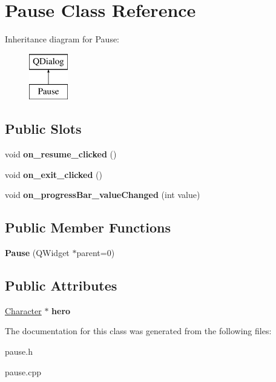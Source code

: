 \hypertarget{class_pause}{\section{Pause Class Reference}
\label{class_pause}
}
Inheritance diagram for Pause\-:\begin{figure}[H]
\begin{center}
\leavevmode
\includegraphics[height=2.000000cm]{class_pause}
\end{center}
\end{figure}
\subsection*{Public Slots}
\begin{DoxyCompactItemize}
\item 
\hypertarget{class_pause_ad632066c1f745b88f328f609de26419f}{void {\bfseries on\-\_\-resume\-\_\-clicked} ()}\label{class_pause_ad632066c1f745b88f328f609de26419f}

\item 
\hypertarget{class_pause_aed0cb80fa11b7556ffe285bb83696e55}{void {\bfseries on\-\_\-exit\-\_\-clicked} ()}\label{class_pause_aed0cb80fa11b7556ffe285bb83696e55}

\item 
\hypertarget{class_pause_a2b4c1e4ee50785bcca1dc1c422f527b3}{void {\bfseries on\-\_\-progress\-Bar\-\_\-value\-Changed} (int value)}\label{class_pause_a2b4c1e4ee50785bcca1dc1c422f527b3}

\end{DoxyCompactItemize}
\subsection*{Public Member Functions}
\begin{DoxyCompactItemize}
\item 
\hypertarget{class_pause_a2677e62030e9d138bc9994f9d6bd727b}{{\bfseries Pause} (Q\-Widget $\ast$parent=0)}\label{class_pause_a2677e62030e9d138bc9994f9d6bd727b}

\end{DoxyCompactItemize}
\subsection*{Public Attributes}
\begin{DoxyCompactItemize}
\item 
\hypertarget{class_pause_ac99bac0f2bea6e439f0d55ba32efe920}{\hyperlink{class_character}{Character} $\ast$ {\bfseries hero}}\label{class_pause_ac99bac0f2bea6e439f0d55ba32efe920}

\end{DoxyCompactItemize}


The documentation for this class was generated from the following files\-:\begin{DoxyCompactItemize}
\item 
pause.\-h\item 
pause.\-cpp\end{DoxyCompactItemize}
